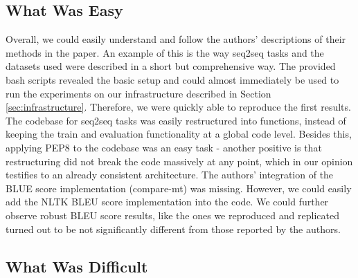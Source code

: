 \subsection{What Was Easy}

Overall, we could easily understand and follow the authors' descriptions of their methods in the paper. An example of this is the way seq2seq tasks and the datasets used were described in a short but comprehensive way. The provided bash scripts revealed the basic setup and could almost immediately be used to run the experiments on our infrastructure described in Section \ref{sec:infrastructure}. Therefore, we were quickly able to reproduce the first results. The codebase for seq2seq tasks was easily restructured into functions, instead of keeping the train and evaluation functionality at a global code level. Besides this, applying PEP8 to the codebase was an easy task - another positive is that restructuring did not break the code massively at any point, which in our opinion testifies to an already consistent architecture.
The authors' integration of the BLUE score implementation (compare-mt) was missing. However, we could easily add the NLTK BLEU score implementation into the code. We could further observe robust BLEU score results, like the ones we reproduced and replicated turned out to be not significantly different from those reported by the authors.

\subsection{What Was Difficult}

